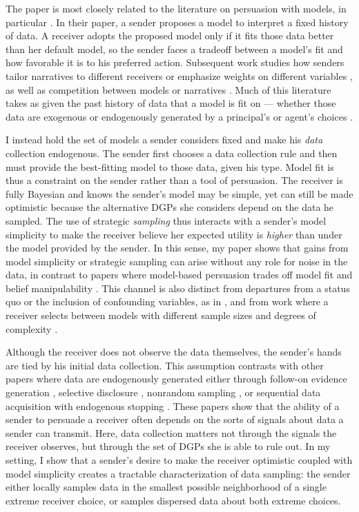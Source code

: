 \documentclass[11pt,dvipsnames]{article}
\begin{document}
The paper is most closely related to the literature on persuasion with models, in particular \citet{schwartzstein2021using}.
In their paper, a sender proposes a model to interpret a fixed history of data.
A receiver adopts the proposed model only if it fits those data better than her default model, so the sender faces a tradeoff between a model's fit and how favorable it is to his preferred action.
Subsequent work studies how senders tailor narratives to different receivers or emphasize weights on different variables \citep{aina2023tailored,barron2024narrative,aina2025weighting}, as well as competition between models or narratives \citep{eliaz2020model,montiel2022competing}.
Much of this literature takes as given the past history of data that a model is fit on --- whether those data are exogenous or endogenously generated by a principal's or agent's choices \citep{eliaz2020model,levy2022misspecified}.

I instead hold the set of models a sender considers fixed and make his \emph{data} collection endogenous.
The sender first chooses a data collection rule and then must provide the best-fitting model to those data, given his type.
Model fit is thus a constraint on the sender rather than a tool of persuasion.
The receiver is fully Bayesian and knows the sender's model may be simple, yet can still be made optimistic because the alternative DGPs she considers depend on the data he sampled.
The use of strategic \emph{sampling} thus interacts with a sender's model simplicity to make the receiver believe her expected utility is \emph{higher} than under the model provided by the sender.
In this sense, my paper shows that gains from model simplicity or strategic sampling can arise without any role for noise in the data, in contrast to papers where model-based persuasion trades off model fit and belief manipulability \citep{aina2023tailored,barron2024narrative,aina2025weighting}.
This channel is also distinct from departures from a status quo or the inclusion of confounding variables, as in \citet{eliaz2020model}, and from work where a receiver selects between models with different sample sizes and degrees of complexity \citep{montiel2022competing}.


Although the receiver does not observe the data themselves, the sender's hands are tied by his initial data collection.
This assumption contrasts with other papers where data are endogenously generated either through follow-on evidence generation \citep{dai2026bayesian}, selective disclosure \citep{felgenhauer2014strategic}, nonrandom sampling \citep{di2021strategic}, or sequential data acquisition with endogenous stopping \citep{henry2019research}.
These papers show that the ability of a sender to persuade a receiver often depends on the sorts of signals about data a sender can transmit.
Here, data collection matters not through the signals the receiver observes, but through the set of DGPs she is able to rule out.
In my setting, I show that a sender's desire to make the receiver optimistic coupled with model simplicity creates a tractable characterization of data sampling: the sender either locally samples data in the smallest possible neighborhood of a single extreme receiver choice, or samples dispersed data about both extreme choices.
\end{document}
